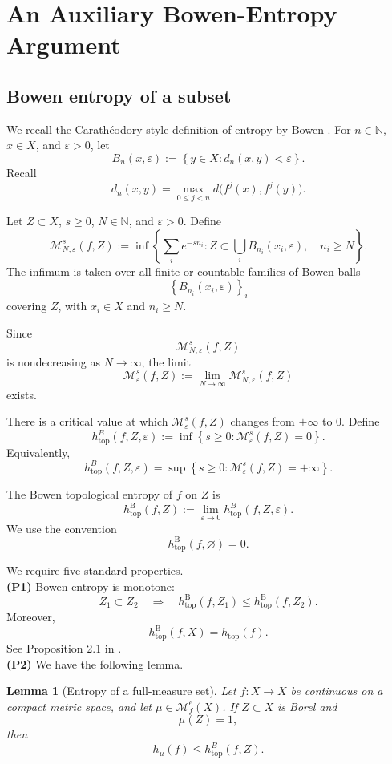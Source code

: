 \documentclass[11pt,reqno]{amsart}
\newtheorem{lemma}[theorem]{Lemma}
\theoremstyle{definition}
\theoremstyle{remark}
\newcommand{\htop}{h_{\mathrm{top}}}
\newcommand{\hB}{h^{\mathrm{B}}_{\mathrm{top}}}
\begin{document}
\section{An Auxiliary Bowen-Entropy Argument}
\label{sec4}

\subsection{Bowen entropy of a subset}

We recall the Carath\'eodory-style definition of entropy by Bowen \cite{b}.
For $n\in\mathbb{N}$, $x\in X$, and $\varepsilon>0$, let
\[
B_n(x,\varepsilon)
:=
\left\{
y\in X:
d_n(x,y)<\varepsilon
\right\}.
\]
Recall
\[
d_n(x,y)
=
\max_{0\leq j<n}
d\bigl(f^j(x),f^j(y)\bigr).
\]

Let $Z\subset X$, $s\geq0$, $N\in\mathbb{N}$, and
$\varepsilon>0$. Define
\[
\mathcal{M}_{N,\varepsilon}^{s}(f,Z)
:=
\inf
\left\{
\sum_{i}e^{-s n_i}:
Z\subset
\bigcup_i B_{n_i}(x_i,\varepsilon),
\quad
n_i\geq N
\right\}.
\]
The infimum is taken over all finite or countable families of Bowen
balls
\[
\left\{
B_{n_i}(x_i,\varepsilon)
\right\}_i
\]
covering $Z$, with $x_i\in X$ and $n_i\geq N$.

Since
\[
\mathcal{M}_{N,\varepsilon}^{s}(f,Z)
\]
is nondecreasing as $N\to\infty$, the limit
\[
\mathcal{M}_{\varepsilon}^{s}(f,Z)
:=
\lim_{N\to\infty}
\mathcal{M}_{N,\varepsilon}^{s}(f,Z)
\]
exists.

There is a critical value at which
$\mathcal{M}_{\varepsilon}^{s}(f,Z)$ changes from $+\infty$ to $0$.
Define
\[
h_{\mathrm{top}}^{B}(f,Z,\varepsilon)
:=
\inf
\left\{
s\geq0:
\mathcal{M}_{\varepsilon}^{s}(f,Z)=0
\right\}.
\]
Equivalently,
\[
h_{\mathrm{top}}^{B}(f,Z,\varepsilon)
=
\sup
\left\{
s\geq0:
\mathcal{M}_{\varepsilon}^{s}(f,Z)=+\infty
\right\}.
\]

The Bowen topological entropy of $f$ on $Z$ is
\[
\hB(f,Z)
:=
\lim_{\varepsilon\to0}
h_{\mathrm{top}}^{B}(f,Z,\varepsilon).
\]
We use the convention
\[
\hB(f,\varnothing)=0.
\]

We require five standard properties.\\

\noindent
{\bf (P1)}
Bowen entropy is monotone:
\[
Z_1\subset Z_2
\quad\Longrightarrow\quad
\hB(f,Z_1)\leq\hB(f,Z_2).
\]
Moreover,
\[
\hB(f,X)=\htop(f).
\]
See Proposition 2.1 in \cite{fh}.\\

\noindent
{\bf (P2)} We have the following lemma.

\begin{lemma}[Entropy of a full-measure set]
\label{l5}
Let $f:X\to X$ be continuous on a compact metric space, and let
$\mu\in\mathcal{M}_f^e(X)$. If $Z\subset X$ is Borel and
\[
\mu(Z)=1,
\]
then
\[
h_\mu(f)\leq h_{\mathrm{top}}^B(f,Z).
\]
\end{lemma}
\end{document}
